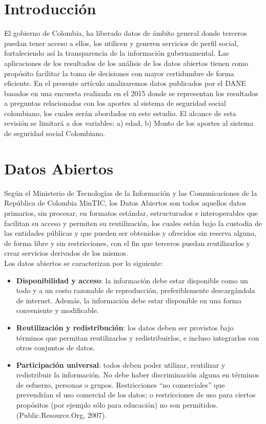 \section{Introducción}
	El gobierno de Colombia, ha liberado datos de ámbito general donde terceros puedan tener acceso a ellos, los utilicen y generen servicios de perfil social, fortaleciendo así la transparencia de la información gubernamental.
	Las aplicaciones de los resultados de los análisis de los datos abiertos tienen como propósito facilitar la toma de decisiones con mayor certidumbre de forma eficiente.
	En el presente artículo analizaremos datos publicados por el DANE basados en una encuesta realizada en el 2015 donde se representan los resultados a preguntas relacionadas con los aportes al sistema de seguridad social colombiano, los cuales serán abordados en este estudio. El alcance de esta revisión se limitará a dos variables: a) edad, b) Monto de los aportes al sistema de seguridad social Colombiano.
	\\

\section{Datos Abiertos}

Según el Ministerio de Tecnologías de la Información y las Comunicaciones de la República de Colombia MinTIC, los Datos Abiertos son todos aquellos datos primarios, sin procesar, en formatos estándar, estructurados e interoperables que facilitan su acceso y permiten su reutilización, los cuales están bajo la custodia de las entidades públicas y que pueden ser obtenidos y ofrecidos sin reserva alguna, de forma libre y sin restricciones, con el fin que terceros puedan reutilizarlos y crear servicios derivados de los mismos.
\\
Los datos abiertos se caracterizan por lo siguiente:
  \begin{itemize}
  	\item \textbf{Disponibilidad y acceso}: la información debe estar disponible como un todo y a un costo razonable de reproducción, preferiblemente descargándola de internet. Además, la información debe estar disponible en una forma conveniente y modificable.
  	
	\item \textbf{Reutilización y redistribución}: los datos deben ser provistos bajo términos que permitan reutilizarlos y redistribuirlos, e incluso integrarlos con otros conjuntos de datos.
	
	\item \textbf{Participación universal}: todos deben poder utilizar, reutilizar y redistribuir la información. No debe haber discriminación alguna en términos de esfuerzo, personas o grupos. Restricciones “no comerciales” que prevendrían el uso comercial de los datos; o restricciones de uso para ciertos propósitos (por ejemplo sólo para educación) no son permitidos. (Public.Resource.Org, 2007).
	
  \end{itemize}

